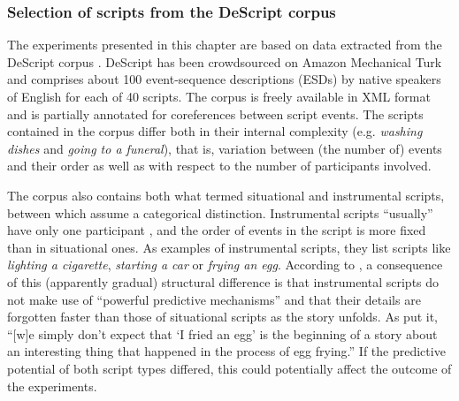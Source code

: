\subsubsection{Selection of scripts from the DeScript corpus}
The experiments presented in this chapter are based on data extracted from the DeScript corpus \citep{wanzare.etal2016}. DeScript has been crowdsourced on Amazon Mechanical Turk and comprises about 100 event-sequence descriptions (ESDs) by native speakers of English for each of 40 scripts. The corpus is freely available in XML format and is partially annotated for coreferences between script events. The scripts contained in the corpus differ both in their internal complexity (e.g. \textit{washing dishes} and \textit{going to a funeral}), that is, variation between (the number of) events and their order as well as with respect to the number of participants involved. 

The corpus also contains both what \citet{schank.abelson1977} termed situational and instrumental scripts, between which \citet{schank.abelson1977} assume a categorical distinction. Instrumental scripts ``usually'' have only one participant \citep[65]{schank.abelson1977}, and the order of events in the script is more fixed than in situational ones. As examples of instrumental scripts, they list scripts like \textit{lighting a cigarette}, \textit{starting a car} or \textit{frying an egg}. According to \citet[66]{schank.abelson1977}, a consequence of this (apparently gradual) structural difference is that instrumental scripts do not make use of ``powerful predictive mechanisms'' and that their details are forgotten faster than those of situational scripts as the story unfolds. As \citet[66]{schank.abelson1977} put it, ``[w]e simply don't expect that `I fried an egg' is the beginning of a story about an interesting thing that happened in the process of egg frying.'' If the predictive potential of both script types differed, this could potentially affect the outcome of the experiments. 

